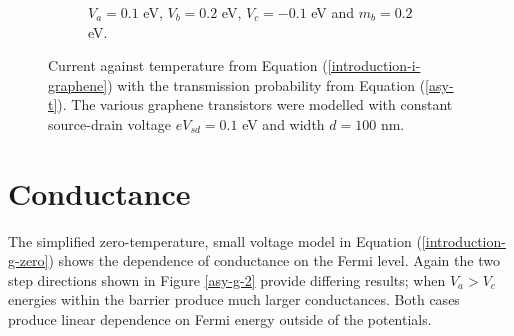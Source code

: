 \begin{figure}[h]
\begin{subfigure}[h]{0.3\textwidth}
				\caption{$V_{a}=0.1$ eV, $V_{b}=0.2$ eV, $V_{c}=-0.1$ eV and $m_{b}=0.2$ eV.}
			\end{subfigure}
			\caption{Current against temperature from Equation (\ref{introduction-i-graphene}) with the transmission probability from Equation (\ref{asy-t}). The various graphene transistors were modelled with constant source-drain voltage $eV_{sd}=0.1$ eV and width $d=100$ nm.}
			\label{asy-t-1}
		\end{figure}
		\section{Conductance}
		\label{Asymmetrical Barrier - Conductance}
		The simplified zero-temperature, small voltage model in Equation (\ref{introduction-g-zero}) shows the dependence of conductance on the Fermi level. Again the two step directions shown in Figure \ref{asy-g-2} provide differing results; when $V_{a}>V_{c}$ energies within the barrier produce much larger conductances. Both cases produce linear dependence on Fermi energy outside of the potentials.
